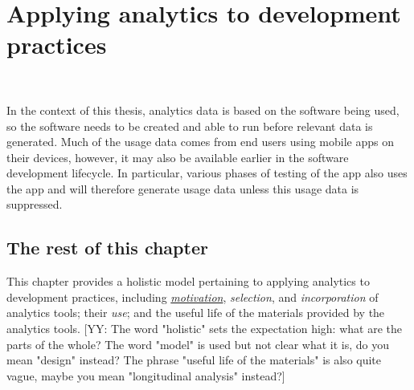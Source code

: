 \chapter{Applying analytics to development practices}~\label{chapter-applying-analytics-to-development-practices}

\def\yy#1{\color{blue}[YY: #1]\color{black}}

In the context of this thesis, analytics data is based on the software being used, so the software needs to be created and able to run before relevant data is generated. 
Much of the usage data comes from end users using mobile apps on their devices, however, it may also be available earlier in the software development lifecycle. In particular, various phases of testing of the app also uses the app and will therefore generate usage data unless this usage data is suppressed. 

\section{The rest of this chapter}
This chapter provides a holistic model pertaining to applying analytics to development practices, including \href{motivation-section}{\textit{motivation}}, \textit{selection}, and \textit{incorporation} of analytics tools; their \textit{use}; and the useful life of the materials provided by the analytics tools. 
\yy{The word "holistic" sets the expectation high: what are the parts of the whole? The word "model" is used but not clear what it is, do you mean "design" instead? The phrase "useful life of the materials" is also quite vague, maybe you mean "longitudinal analysis" instead?}


